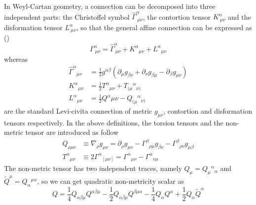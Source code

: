 \documentclass[preprint]{aastex631}
\begin{document}
In Weyl-Cartan geometry, a connection
can be decomposed into three independent parts: the Christoffel symbol $\hat{\Gamma}^\alpha_{\ \mu \nu}$, the contortion tensor $K^\alpha_{\ \mu \nu}$ and the disformation tensor $L^\alpha_{\ \mu \nu}$, so that the general affine connection can be expressed as (\cite{J_rv_2018})
\begin{equation}
    \Gamma^\alpha_{\ \mu \nu}=\hat{\Gamma}^\alpha_{\ \mu \nu}+K^{\alpha}{}_{\mu \nu}+L^\alpha{}_{\mu \nu}
\end{equation}
whereas
\begin{align}
\hat{\Gamma}^\alpha{}_{\mu \nu}& =\frac{1}{2}g^{\alpha \beta}(\partial_\mu g_{\beta \nu}+\partial_\nu g_{\beta \mu}-\partial_\beta g_{\mu \nu}) \\
K^{\alpha }{}_{\mu \nu }& = \frac{1}{2}T^{\alpha }{}_{\mu \nu }+T_{(\mu}{}^{\alpha }{}_{\nu )} \\
L^{\alpha}{}_{\mu\nu}& = \frac{1}{2}Q^{\alpha}_{}{\mu\nu}-Q_{(\mu}{}^{\alpha }{}_{\nu)}
\end{align}
are the standard Levi-civita connection of metric $g_{\mu \nu}$, contortion and disformation tensors respectively.
In the above definitions, the torsion tensors and the non-metric tensor are introduced as follow
\begin{align}
Q_{\rho \mu\nu} &\equiv \nabla_{\rho} g_{\mu\nu} = \partial_\rho g_{\mu\nu} - \Gamma^\beta{}_{\rho \mu} g_{\beta\nu} - \Gamma^\beta{}_{\rho\nu} g_{\mu\beta}\\
T^{\alpha}{}_{\mu\nu} &\equiv 2\Gamma^{\alpha}{}_{[\mu\nu]} =\Gamma^{\alpha}{}_{\mu\nu}-\Gamma^{\alpha}{}_{\nu\mu}
\end{align}
The non-metric tensor has two independent traces, namely $Q_{\mu}=Q_{\mu}{}^{\alpha}{}_{\alpha}$ and $\tilde{Q}^{\mu}=Q_{\alpha}{}^{\mu \alpha}$, so we can get quadratic non-metricity scalar as
\begin{equation}
    Q=\dfrac{1}{4}Q_{\alpha\beta\mu}Q^{\alpha\beta\mu}-\dfrac{1}{2}Q_{\alpha\beta\mu}Q^{\beta\mu\alpha}-\dfrac{1}{4}Q_{\alpha}Q^{\alpha}+\dfrac{1}{2}Q_{\alpha}\tilde{Q}^\alpha\label{Qscalar} 
\end{equation} 
\end{document}
